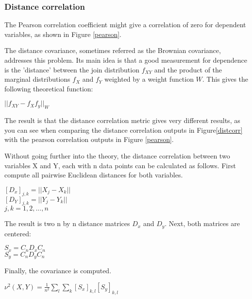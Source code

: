 \subsubsection{Distance correlation}
The Pearson correlation coefficient might give a correlation of zero for dependent variables, as shown in Figure \ref{pearson}.


The distance covariance, sometimes referred as the Brownian covariance, addresses this problem\citep{distPaper}. Its main idea is that a good measurement for dependence is the 'distance' between the join distribution $f_{XY}$ and the product of the marginal distributions $f_X$ and $f_Y$ weighted by a weight function $W$. This gives the following theoretical function:

\begin{center}
$|| f_{XY} - f_Xf_y||_W$
\end{center}

The result is that the distance correlation metric gives very different results, as you can see when comparing the distance correlation outputs in Figure\ref{distcorr} with the pearson correlation outputs in Figure \ref{pearson}.


Without going further into the theory, the distance correlation between two variables X and Y, each with n data points can be calculated as follows.
First compute all pairwise Euclidean distances for both variables.
\begin{center}
$[D_x]_{j,k} = || X_j - X_k||$ \\
$[D_Y]_{j,k} = || Y_j - Y_k||$ \\
$j,k = 1,2,...,n$\\
\end{center}
The result is two n by n distance matrices $D_x$ and $D_y$. Next, both matrices are centered:
\begin{center}
$S_x = C_nD_xC_n$\\
$S_y = C_nD_yC_n$\\
\end{center}
Finally, the covariance is computed.
\begin{center}
$\nu^2(X,Y) = \frac{1}{n^2} \sum\limits_l \sum\limits_k [S_x]_{k,l}[S_y]_{k,l}$ 
\end{center}

